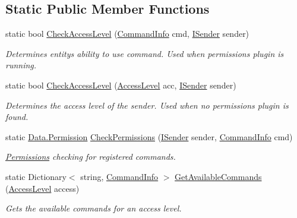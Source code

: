 \subsection*{Static Public Member Functions}
\begin{DoxyCompactItemize}
\item 
static bool \hyperlink{classOTA_1_1Command_1_1CommandParser_a5e6d68105b93fbe34dd91d53524b885a}{Check\+Access\+Level} (\hyperlink{classOTA_1_1Command_1_1CommandInfo}{Command\+Info} cmd, \hyperlink{interfaceOTA_1_1Command_1_1ISender}{I\+Sender} sender)
\begin{DoxyCompactList}\small\item\em Determines entity\textquotesingle{}s ability to use command. Used when permissions plugin is running. \end{DoxyCompactList}\item 
static bool \hyperlink{classOTA_1_1Command_1_1CommandParser_a6ac1e5a324c24c8cbea348e63848cfb1}{Check\+Access\+Level} (\hyperlink{namespaceOTA_1_1Command_a0bb463ef02a9fd3406866a98c6fc2cdc}{Access\+Level} acc, \hyperlink{interfaceOTA_1_1Command_1_1ISender}{I\+Sender} sender)
\begin{DoxyCompactList}\small\item\em Determines the access level of the sender. Used when no permissions plugin is found. \end{DoxyCompactList}\item 
static \hyperlink{namespaceOTA_1_1Data_a5335d23d62bc219ccbf40b018c002e8d}{Data.\+Permission} \hyperlink{classOTA_1_1Command_1_1CommandParser_ad96b35937fbc31608107174335577ed6}{Check\+Permissions} (\hyperlink{interfaceOTA_1_1Command_1_1ISender}{I\+Sender} sender, \hyperlink{classOTA_1_1Command_1_1CommandInfo}{Command\+Info} cmd)
\begin{DoxyCompactList}\small\item\em \hyperlink{namespaceOTA_1_1Permissions}{Permissions} checking for registered commands. \end{DoxyCompactList}\item 
static Dictionary$<$ string, \hyperlink{classOTA_1_1Command_1_1CommandInfo}{Command\+Info} $>$ \hyperlink{classOTA_1_1Command_1_1CommandParser_a267151a0a06efe756f206df9a8e99f0b}{Get\+Available\+Commands} (\hyperlink{namespaceOTA_1_1Command_a0bb463ef02a9fd3406866a98c6fc2cdc}{Access\+Level} access)
\begin{DoxyCompactList}\small\item\em Gets the available commands for an access level. \end{DoxyCompactList}\item 

\end{DoxyCompactItemize}
